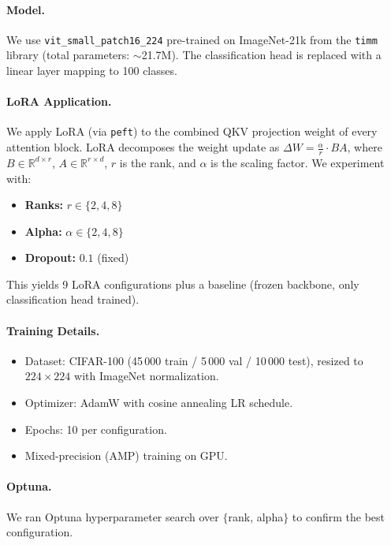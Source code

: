 \documentclass[11pt,a4paper]{article}
\begin{document}
\paragraph{Model.} We use \texttt{vit\_small\_patch16\_224} pre-trained on ImageNet-21k from the \texttt{timm} library (total parameters: $\sim$21.7M). The classification head is replaced with a linear layer mapping to 100 classes.

\paragraph{LoRA Application.} We apply LoRA (via \texttt{peft}) to the combined QKV projection weight of every attention block. LoRA decomposes the weight update as $\Delta W = \frac{\alpha}{r} \cdot BA$, where $B \in \mathbb{R}^{d \times r}$, $A \in \mathbb{R}^{r \times d}$, $r$ is the rank, and $\alpha$ is the scaling factor. We experiment with:
\begin{itemize}
  \item \textbf{Ranks:} $r \in \{2, 4, 8\}$
  \item \textbf{Alpha:} $\alpha \in \{2, 4, 8\}$
  \item \textbf{Dropout:} $0.1$ (fixed)
\end{itemize}
This yields 9 LoRA configurations plus a baseline (frozen backbone, only classification head trained).

\paragraph{Training Details.}
\begin{itemize}
  \item Dataset: CIFAR-100 (45\,000 train / 5\,000 val / 10\,000 test), resized to $224\times224$ with ImageNet normalization.
  \item Optimizer: AdamW with cosine annealing LR schedule.
  \item Epochs: 10 per configuration.
  \item Mixed-precision (AMP) training on GPU.
\end{itemize}

\paragraph{Optuna.} We ran Optuna hyperparameter search over $\{$rank, alpha$\}$ to confirm the best configuration.

\end{document}
